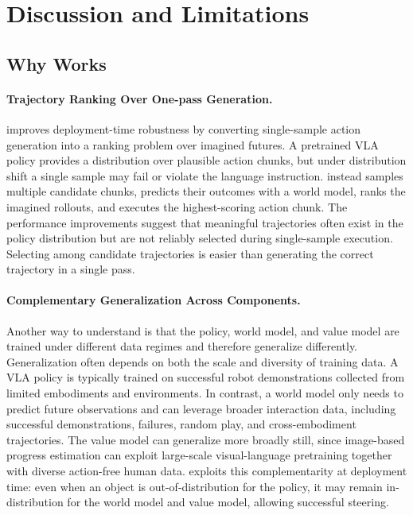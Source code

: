 \section{Discussion and Limitations}

\subsection{Why \coolname{} Works}

\paragraph{Trajectory Ranking Over One-pass Generation.}
\coolname{} improves deployment-time robustness by converting single-sample action generation into a ranking problem over imagined futures. A pretrained VLA policy provides a distribution over plausible action chunks, but under distribution shift a single sample may fail or violate the language instruction. \coolname{} instead samples multiple candidate chunks, predicts their outcomes with a world model, ranks the imagined rollouts, and executes the highest-scoring action chunk. The performance improvements suggest that meaningful trajectories often exist in the policy distribution but are not reliably selected during single-sample execution. Selecting among candidate trajectories is easier than generating the correct trajectory in a single pass.


\paragraph{Complementary Generalization Across Components.}
Another way to understand \coolname{} is that the policy, world model, and value model are trained under different data regimes and therefore generalize differently. Generalization often depends on both the scale and diversity of training data. A VLA policy is typically trained on successful robot demonstrations collected from limited embodiments and environments. In contrast, a world model only needs to predict future observations and can leverage broader interaction data, including successful demonstrations, failures, random play, and cross-embodiment trajectories. The value model can generalize more broadly still, since image-based progress estimation can exploit large-scale visual-language pretraining together with diverse action-free human data. \coolname{} exploits this complementarity at deployment time: even when an object is out-of-distribution for the policy, it may remain in-distribution for the world model and value model, allowing successful steering.

